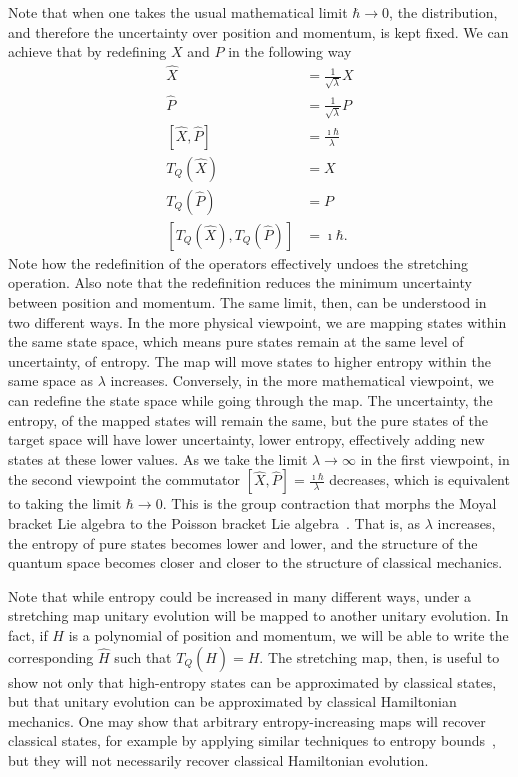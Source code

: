 \documentclass{SciPost}
\begin{document}
Note that when one takes the usual mathematical limit $\hbar \to 0$, the distribution, and therefore the uncertainty over position and momentum, is kept fixed. We can achieve that by redefining $X$ and $P$ in the following way
\begin{align}
	\hat{X} &= \frac{1}{\sqrt{\lambda}} X \\
	\hat{P} &= \frac{1}{\sqrt{\lambda}} P \\
	[\hat{X}, \hat{P}] &= \frac{\imath \hbar}{\lambda} \\
	T_Q(\hat{X}) &=  X \\
	T_Q(\hat{P}) &=  P \\
	[T_Q(\hat{X}), T_Q(\hat{P})] &= \imath \hbar.
\end{align}
Note how the redefinition of the operators effectively undoes the stretching operation. Also note that the redefinition reduces the minimum uncertainty between position and momentum. The same limit, then, can be understood in two different ways. In the more physical viewpoint, we are mapping states within the same state space, which means pure states remain at the same level of uncertainty, of entropy. The map will move states to higher entropy within the same space as $\lambda$ increases. Conversely, in the more mathematical viewpoint, we can redefine the state space while going through the map. The uncertainty, the entropy, of the mapped states will remain the same, but the pure states of the target space will have lower  uncertainty, lower entropy, effectively adding new states at these lower values. As we take the limit $\lambda \to \infty$ in the first viewpoint, in the second viewpoint the commutator $[\hat{X},\hat{P}] = \frac{\imath \hbar}{\lambda}$ decreases, which is equivalent to taking the limit $\hbar \to 0$. This is the group contraction that morphs the Moyal bracket Lie algebra to the Poisson bracket Lie algebra~\cite{Moyal_1949,saletan1961contraction, inonu1953contraction}. That is, as $\lambda$ increases, the entropy of pure states becomes lower and lower, and the structure of the quantum space becomes closer and closer to the structure of classical mechanics.

Note that while entropy could be increased in many different ways, under a stretching map unitary evolution will be mapped to another unitary evolution. In fact, if $H$ is a polynomial of position and momentum, we will be able to write the corresponding $\hat{H}$ such that $T_Q(\hat{H}) = H$. The stretching map, then, is useful to show not only that high-entropy states can be approximated by classical states, but that unitary evolution can be approximated by classical Hamiltonian mechanics. One may show that arbitrary entropy-increasing maps will recover classical states, for example by applying similar techniques to entropy bounds~\cite{Hall_2018}, but they will not necessarily recover classical Hamiltonian evolution.
\end{document}
